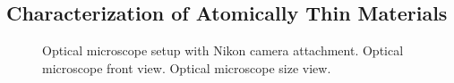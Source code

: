 \subsection{Characterization of Atomically Thin Materials}\label{subsec:exfoliation_characterization}
\begin{figure}[ht]
    \centering
    \qquad
    \caption[Optical microscope setup]{
        Optical microscope setup with Nikon camera attachment.
        \protect{} Optical microscope front view. 
        \protect{} Optical microscope size view.}
\end{figure}
